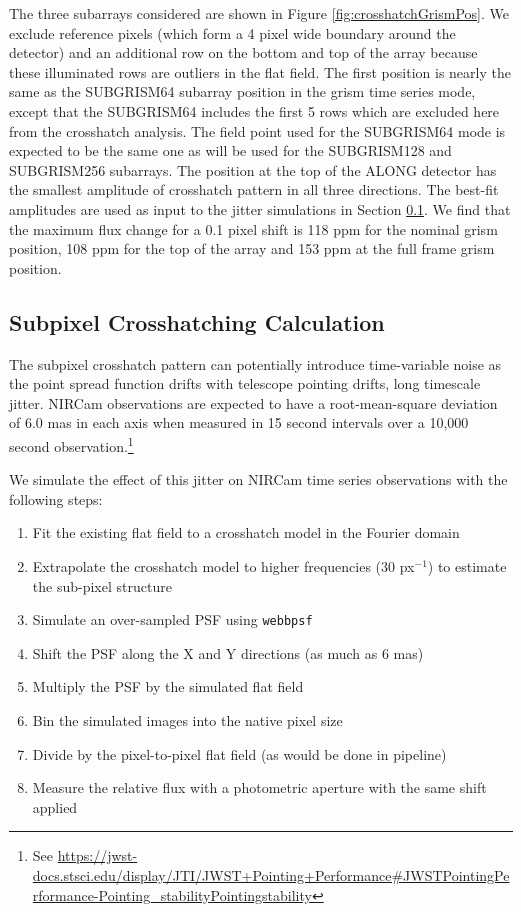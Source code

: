 \documentclass[]{aastex62}
\begin{document}
The three subarrays considered are shown in Figure \ref{fig:crosshatchGrismPos}.
We exclude reference pixels (which form a 4 pixel wide boundary around the detector) and an additional row on the bottom and top of the array because these illuminated rows are outliers in the flat field.
The first position is nearly the same as the SUBGRISM64 subarray position in the grism time series mode, except that the SUBGRISM64 includes the first 5 rows which are excluded here from the crosshatch analysis.
The field point used for the SUBGRISM64 mode is expected to be the same one as will be used for the SUBGRISM128 and SUBGRISM256 subarrays.
The position at the top of the ALONG detector has the smallest amplitude of crosshatch pattern in all three directions.
The best-fit amplitudes are used as input to the jitter simulations in Section \ref{sec:CrosshatchSim}.
We find that the maximum flux change for a 0.1 pixel shift is 118 ppm for the nominal grism position, 108 ppm for the top of the array and 153 ppm at the full frame grism position.

\subsection{Subpixel Crosshatching Calculation}\label{sec:CrosshatchSim}

The subpixel crosshatch pattern can potentially introduce time-variable noise as the point spread function drifts with telescope pointing drifts, long timescale jitter.
NIRCam observations are expected to have a root-mean-square deviation of 6.0 mas in each axis when measured in 15 second intervals over a 10,000 second observation.\footnote{See \url{https://jwst-docs.stsci.edu/display/JTI/JWST+Pointing+Performance\#JWSTPointingPerformance-Pointing\_stabilityPointingstability}}

We simulate the effect of this jitter on NIRCam time series observations with the following steps:
\begin{enumerate}
	\item Fit the existing flat field to a crosshatch model in the Fourier domain
	\item Extrapolate the crosshatch model to higher frequencies (30 px$^{-1}$) to estimate the sub-pixel structure
	\item Simulate an over-sampled PSF using \texttt{webbpsf} \citep{perrin2014webbpsf}
	\item Shift the PSF along the X and Y directions (as much as 6 mas) \label{it:xHatchShiftPSF}
	\item Multiply the PSF by the simulated flat field
	\item Bin the simulated images into the native pixel size
	\item Divide by the pixel-to-pixel flat field (as would be done in pipeline)
	\item Measure the relative flux with a photometric aperture with the same shift applied \label{it:xHatchApPhot}
\end{enumerate}
\end{document}
